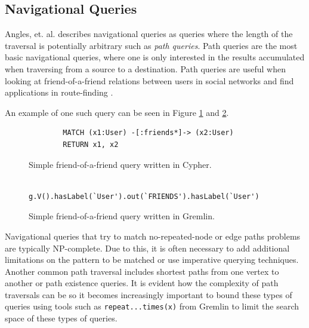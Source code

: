 \subsection{Navigational Queries}

Angles, et. al. \cite{foundations-of-modern-gql} describes navigational queries as queries where the length of the traversal is potentially arbitrary such as \emph{path queries}. Path queries are the most basic navigational queries, where one is only interested in the results accumulated when traversing from a source to a destination. Path queries are useful when looking at friend-of-a-friend relations between users in social networks and find applications in route-finding \cite{route-finding}.

An example of one such query can be seen in Figure \ref{lst:cypher-nav-1} and \ref{lst:gremlin-nav-1}.

\begin{figure}
    \centering
    \begin{verbatim}
        MATCH (x1:User) -[:friends*]-> (x2:User)
        RETURN x1, x2
    \end{verbatim}
    \caption{Simple friend-of-a-friend query written in Cypher.}
    \label{lst:cypher-nav-1}
\end{figure}

\begin{figure}
    \centering
    \begin{verbatim}
        g.V().hasLabel(`User').out(`FRIENDS').hasLabel(`User')
    \end{verbatim}
    \caption{Simple friend-of-a-friend query written in Gremlin.}
    \label{lst:gremlin-nav-1}
\end{figure}

Navigational queries that try to match no-repeated-node or edge paths problems are typically NP-complete. Due to this, it is often necessary to add additional limitations on the pattern to be matched or use imperative querying techniques. Another common path traversal includes shortest paths from one vertex to another or path existence queries. It is evident how the complexity of path traversals can be so it becomes increasingly important to bound these types of queries using tools such as \texttt{repeat...times(x)} from Gremlin to limit the search space of these types of queries.
